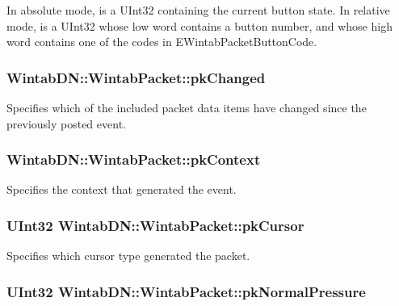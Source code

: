 In absolute mode, is a UInt32 containing the current button state. In relative mode, is a UInt32 whose low word contains a button number, and whose high word contains one of the codes in EWintabPacketButtonCode. 

\hypertarget{struct_wintab_d_n_1_1_wintab_packet_a5a6a3eaeed23e1898551cb42267a7167}{
\subsubsection[{pkChanged}]{ {\bf WintabDN::WintabPacket::pkChanged}}}
\label{struct_wintab_d_n_1_1_wintab_packet_a5a6a3eaeed23e1898551cb42267a7167}


Specifies which of the included packet data items have changed since the previously posted event. 

\hypertarget{struct_wintab_d_n_1_1_wintab_packet_a8e32af4bfcc46357c69ac501b756ac38}{
\subsubsection[{pkContext}]{ {\bf WintabDN::WintabPacket::pkContext}}}
\label{struct_wintab_d_n_1_1_wintab_packet_a8e32af4bfcc46357c69ac501b756ac38}


Specifies the context that generated the event. 

\hypertarget{struct_wintab_d_n_1_1_wintab_packet_afb9d197243879d81f43b1aaa482507ef}{
\subsubsection[{pkCursor}]{\setlength{\rightskip}{0pt plus 5cm}UInt32 {\bf WintabDN::WintabPacket::pkCursor}}}
\label{struct_wintab_d_n_1_1_wintab_packet_afb9d197243879d81f43b1aaa482507ef}


Specifies which cursor type generated the packet. 

\hypertarget{struct_wintab_d_n_1_1_wintab_packet_a9b097766cb4ac1294d439031babe7d1f}{
\subsubsection[{pkNormalPressure}]{\setlength{\rightskip}{0pt plus 5cm}UInt32 {\bf WintabDN::WintabPacket::pkNormalPressure}}}
\label{struct_wintab_d_n_1_1_wintab_packet_a9b097766cb4ac1294d439031babe7d1f}


